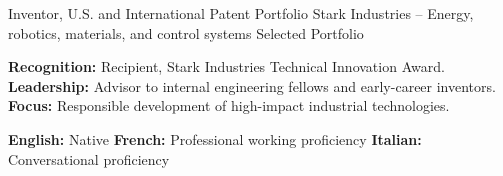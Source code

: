 \resumesection{\certificationstitle}

\resumeentry
    {Inventor, U.S. and International Patent Portfolio}
    {Stark Industries -- Energy, robotics, materials, and control systems}
    {Selected Portfolio}

\resumesection{\additionalinfotitle}

\textbf{Recognition:} Recipient, Stark Industries Technical Innovation Award. \quad
\textbf{Leadership:} Advisor to internal engineering fellows and early-career inventors. \quad
\textbf{Focus:} Responsible development of high-impact industrial technologies.
\par

\resumesection{\languagestitle}

\textbf{English:} Native \quad
\textbf{French:} Professional working proficiency \quad
\textbf{Italian:} Conversational proficiency
